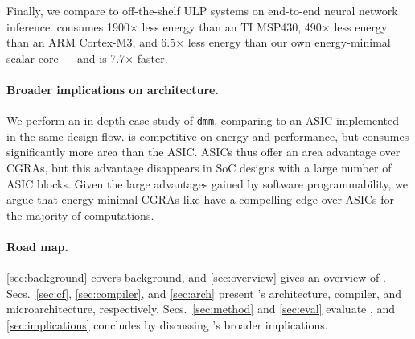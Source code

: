 Finally, we compare \riptide to off-the-shelf ULP systems on end-to-end neural network inference.
\riptide consumes 1900$\times$ less energy than an TI MSP430,
490$\times$ less energy than an ARM Cortex-M3,
and 6.5$\times$ less energy than our own energy-minimal scalar core
--- and \riptide is 7.7$\times$ faster.

\paragraph{Broader implications on architecture.}

We perform an in-depth case study of {\tt dmm},
comparing \riptide to an ASIC implemented in the same
design flow. \riptide is competitive on energy and performance, but
consumes significantly more area than the ASIC.
%
ASICs thus offer an area advantage over CGRAs, but this advantage
disappears in SoC designs with a large number of ASIC blocks. Given
the large advantages gained by software programmability, we argue that
energy-minimal CGRAs like \riptide have a compelling edge over ASICs for
the majority of computations.

\paragraph{Road map.}
%
\autoref{sec:background} covers background, and
\autoref{sec:overview} gives an overview of \riptide.
%
Secs.~\ref{sec:cf}, \ref{sec:compiler}, and \ref{sec:arch} present
\riptide's architecture, compiler, and microarchitecture, respectively.
%
Secs.~\ref{sec:method} and \ref{sec:eval} evaluate \riptide, and
\autoref{sec:implications} concludes by discussing \riptide's broader implications.


